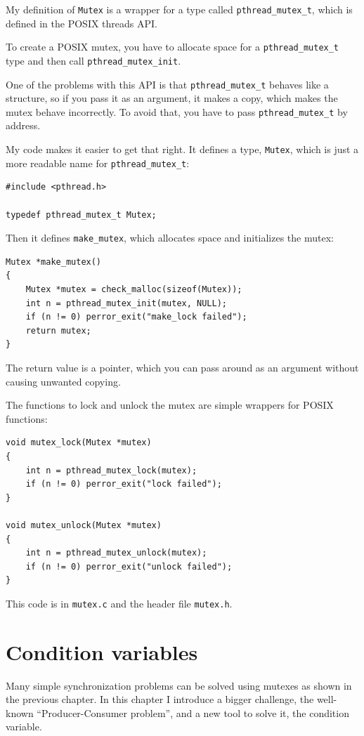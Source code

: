 \documentclass[12pt]{book}
\begin{document}
{My definition of {\tt Mutex} is a wrapper for a type called
\verb"pthread_mutex_t", which is defined in the POSIX threads API.

To create a POSIX mutex, you have to allocate space for a
\verb"pthread_mutex_t" type and then call \verb"pthread_mutex_init".

One of the problems with this API is that \verb"pthread_mutex_t"
behaves like a structure, so if you pass it as an argument, it makes a
copy, which makes the mutex behave incorrectly.  To avoid that, you have to
pass \verb"pthread_mutex_t" by address.

My code makes it easier to get that right.  It defines a
type, {\tt Mutex}, which is just a more readable name for
\verb"pthread_mutex_t":

\begin{verbatim}
#include <pthread.h>

typedef pthread_mutex_t Mutex;
\end{verbatim}

Then it defines \verb"make_mutex", which allocates space and
initializes the mutex:

\begin{verbatim}
Mutex *make_mutex()
{
    Mutex *mutex = check_malloc(sizeof(Mutex));
    int n = pthread_mutex_init(mutex, NULL);
    if (n != 0) perror_exit("make_lock failed"); 
    return mutex;
}
\end{verbatim}

The return value is a pointer, which you can pass around as an
argument without causing unwanted copying.

The functions to lock and unlock the mutex are simple wrappers
for POSIX functions:

\begin{verbatim}
void mutex_lock(Mutex *mutex)
{
    int n = pthread_mutex_lock(mutex);
    if (n != 0) perror_exit("lock failed");
}

void mutex_unlock(Mutex *mutex)
{
    int n = pthread_mutex_unlock(mutex);
    if (n != 0) perror_exit("unlock failed");
}
\end{verbatim}

This code is in {\tt mutex.c} and the header file {\tt mutex.h}.


\chapter{Condition variables}
\label{csem}

Many simple synchronization problems can be solved using mutexes
as shown in the previous chapter.  In this chapter I introduce a
bigger challenge, the well-known ``Producer-Consumer problem'', and
a new tool to solve it, the condition variable.

}
\end{document}
